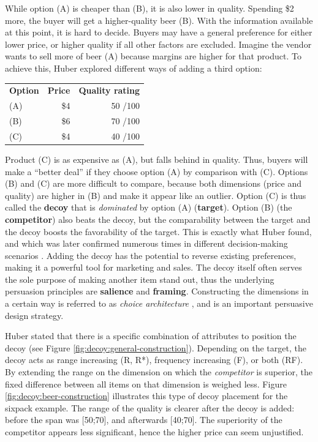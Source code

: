 While option (A) is cheaper than (B), it is also lower in quality. Spending \$2 more, the buyer will get a higher-quality beer (B). With the information available at this point, it is hard to decide. 
Buyers may have a general preference for either lower price, or higher quality if all other factors are excluded. Imagine the vendor wants to sell more of beer (A) because margins are higher for that product. To achieve this, Huber \etal explored different ways of adding a third option:
\begin{table}[!h]
\begin{tabular}{lrr}
	\textbf{Option} & \textbf{Price} & \textbf{Quality rating}\\
	(A) & \$4 & 50 \small{/100} \\
	(B) & \$6 & 70 \small{/100}\\
	(C) & \$4 & 40 \small{/100} \\
\end{tabular} 
\end{table}

Product (C) is as expensive as (A), but falls behind in quality. Thus, buyers will make a ``better deal'' if they choose option (A) by comparison with (C). Options (B) and (C) are more difficult to compare, because both dimensions (price and quality) are higher in (B) and make it appear like an outlier. Option (C) is thus called the \textbf{decoy} that is \textit{dominated} by option (A) (\textbf{target}). Option (B) (the \textbf{competitor}) also beats the decoy, but the comparability between the target and the decoy boosts the favorability of the target. This is exactly what Huber \etal found, and which was later confirmed numerous times in different decision-making scenarios \cite{Ariely1995ExplanationSubjectiveDominance}. Adding the decoy has the potential to reverse existing preferences, making it a powerful tool for marketing and sales. The decoy itself often serves the sole purpose of making another item stand out, thus the underlying persuasion principles are \textbf{salience} and \textbf{framing}. Constructing the dimensions in a certain way is referred to as \textit{choice architecture} \cite{Thaler2010ChoiceArchitecture}, and is an important persuasive design strategy. 

Huber \etal stated that there is a specific combination of attributes to position the decoy (see Figure \ref{fig:decoy:general-construction}). Depending on the target, the decoy acts as range increasing (R, R*), frequency increasing (F), or both (RF). By extending the range on the dimension on which the \textit{competitor} is superior, the fixed difference between all items on that dimension is weighed less. Figure \ref{fig:decoy:beer-construction} illustrates this type of decoy placement for the sixpack example. The range of the quality is clearer after the decoy is added: before the span was [50;70], and afterwards [40;70]. The superiority of the competitor appears less significant, hence the higher price can seem unjustified. 

